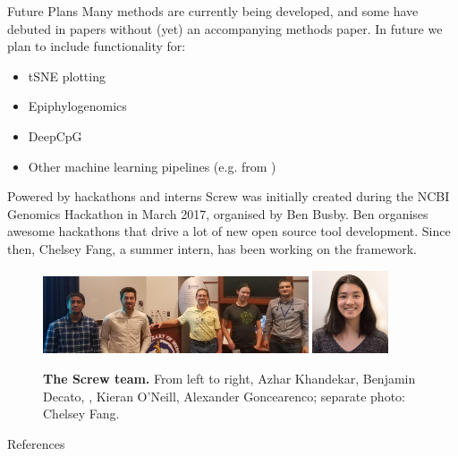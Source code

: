 \documentclass{beamer}
\begin{document}
\begin{frame}
\begin{columns}[t]
\begin{column}{.65\textwidth}
\begin{columns}[t,totalwidth=\textwidth]
\begin{column}{.48\textwidth}
\begin{block}{Future Plans}
Many methods are currently being developed, and some have debuted in papers without (yet) an accompanying methods paper. In future we plan to include functionality for:
\begin{itemize}
\item tSNE plotting
\item Epiphylogenomics
\item DeepCpG
\item Other machine learning pipelines (e.g. from \cite{Farlik2016}) 
\end{itemize}

\end{block}


\begin{block}{Powered by hackathons and interns}
Screw was initially created during the NCBI Genomics Hackathon in March 2017, organised by Ben Busby. Ben organises awesome hackathons that drive a lot of new open source tool development. Since then, Chelsey Fang, a summer intern, has been working on the framework.


\begin{figure}
\begin{center}
  \includegraphics[width=0.7\textwidth]{figures/hackathon_team.jpg}
  \includegraphics[width=0.2\textwidth]{figures/chelsey.jpg}
\end{center}
\caption{\textbf{The Screw team.} From left to right, Azhar Khandekar, Benjamin Decato, , Kieran O'Neill, Alexander Goncearenco; separate photo: Chelsey Fang.}
\end{figure}

\end{block}

\begin{block}{References}

\printbibliography[heading=none]
\end{block}




\end{column}
\end{columns}
\end{column}
\end{columns}
\end{frame}
\end{document}
